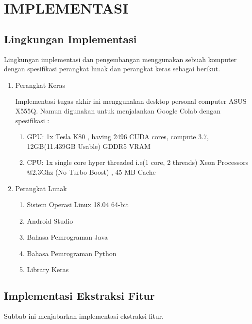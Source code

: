 \chapter {IMPLEMENTASI}

\section{Lingkungan Implementasi}

Lingkungan implementasi dan pengembangan menggunakan sebuah komputer dengan spesifikasi perangkat lunak dan perangkat keras sebagai berikut.

\begin{enumerate}
	\item Perangkat Keras
	\par Implementasi tugas akhir ini menggunakan desktop personal computer ASUS X555Q. Namun digunakan untuk menjalankan Google Colab dengan spesifikasi :
	\begin{enumerate}
		\item GPU: 1x Tesla K80 , having 2496 CUDA cores, compute 3.7, 12GB(11.439GB Usable) GDDR5 VRAM
		\item CPU: 1x single core hyper threaded i.e(1 core, 2 threads) Xeon Processors @2.3Ghz (No Turbo Boost) , 45 MB Cache
	\end{enumerate}
	\item Perangkat Lunak
	\begin{enumerate}
		\item Sistem Operasi Linux 18.04 64-bit
		\item Android Studio
		\item Bahasa Pemrograman Java
		\item Bahasa Pemrograman Python
		\item Library Keras
	\end{enumerate}
\end{enumerate}

\section{Implementasi Ekstraksi Fitur}
Subbab ini menjabarkan implementasi ekstraksi fitur. 

